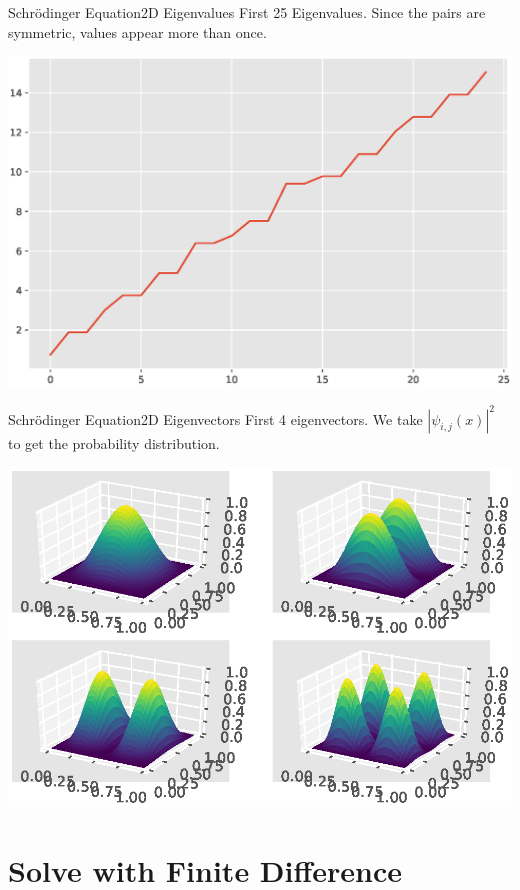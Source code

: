 \documentclass[mathserif]{beamer}
\begin{document}
\begin{frame}{Schrödinger Equation}{2D Eigenvalues}
First 25 Eigenvalues. Since the pairs are symmetric, values appear more than once.

\center \includegraphics[scale=0.4]{Ea25.eps}

  
\end{frame}

\begin{frame}{Schrödinger Equation}{2D Eigenvectors}
First 4 eigenvectors. We take $| \psi_{i,j}(x) |^2$ to get the probability distribution.

\center \includegraphics[scale=0.6]{psi1234.eps}

  
\end{frame}

\section{Solve with Finite Difference}
\end{document}
